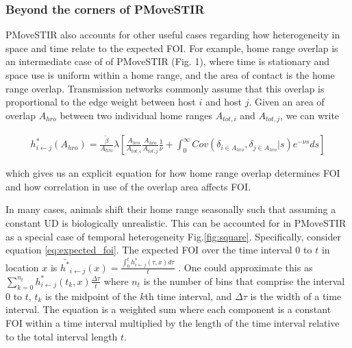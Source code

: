 \documentclass[letterpaper]{article}
\begin{document}


\subsubsection*{Beyond the corners of PMoveSTIR}

PMoveSTIR also accounts for other useful cases regarding how heterogeneity in space and time relate to the expected FOI. For example, home range overlap is an intermediate case of of PMoveSTIR (Fig. 1), where time is stationary and space use is uniform within a home range, and the area of contact is the home range overlap.  
Transmission networks commonly assume that this overlap is proportional to the edge weight between host $i$ and host $j$. 
Given an area of overlap $A_{hro}$ between two individual home ranges $A_{tot, i}$ and $A_{tot, j}$, we can write

\begin{equation}
    \begin{aligned}
    h^*_{i \leftarrow j}(A_{hro}) = \frac{\tilde{\beta}}{A_{hro}} \lambda \left[\frac{A_{hro}}{A_{tot, i}} \frac{A_{hro}}{A_{tot, j}}  \frac{1}{\nu} + \int_{0}^{\infty} Cov(\delta_{i \in A_{hro}}, \delta_{j \in A_{hro}} | s) e^{-\nu s} ds\right]
    \end{aligned}
    \label{eq:home_range}
\end{equation}

which gives us an explicit equation for how home range overlap determines FOI and how correlation in use of the overlap area affects FOI. 

In many cases, animals shift their home range seasonally \citep{Viana2018,Richard2014} such that assuming a constant UD is biologically unrealistic. This can be accounted for in PMoveSTIR as a special case of temporal heterogeneity Fig.\ref{fig:square}.  Specifically, consider equation \ref{eq:expected_foi}. The expected FOI over the time interval 0 to $t$ in location $x$ is $\bar{h^*}_{i \leftarrow j}(x) = \frac{\int_0^t h^*_{i \leftarrow j}(\tau, x) d\tau}{t}$ \citep{Wilber2022}.  One could approximate this as $\sum_{k = 0}^{n_t} h^*_{i \leftarrow j}(t_k, x) \frac{\Delta \tau}{t}$ where $n_t$ is the number of bins that comprise the interval 0 to $t$, $t_k$ is the midpoint of the $k$th time interval, and $\Delta \tau$ is the width of a time interval.  The equation is a weighted sum where each component is a constant FOI within a time interval multiplied by the length of the time interval relative to the total interval length $t$.  
\end{document}
